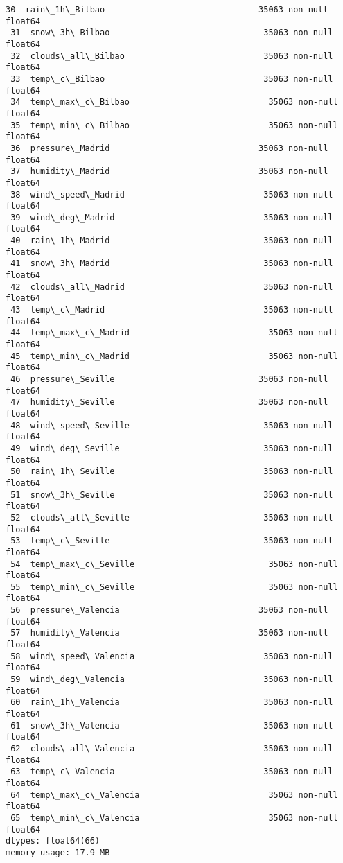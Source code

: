 \documentclass[11pt]{article}
\begin{document}
\begin{Verbatim}[commandchars=\\\{\}]
 30  rain\_1h\_Bilbao                               35063 non-null  float64
 31  snow\_3h\_Bilbao                               35063 non-null  float64
 32  clouds\_all\_Bilbao                            35063 non-null  float64
 33  temp\_c\_Bilbao                                35063 non-null  float64
 34  temp\_max\_c\_Bilbao                            35063 non-null  float64
 35  temp\_min\_c\_Bilbao                            35063 non-null  float64
 36  pressure\_Madrid                              35063 non-null  float64
 37  humidity\_Madrid                              35063 non-null  float64
 38  wind\_speed\_Madrid                            35063 non-null  float64
 39  wind\_deg\_Madrid                              35063 non-null  float64
 40  rain\_1h\_Madrid                               35063 non-null  float64
 41  snow\_3h\_Madrid                               35063 non-null  float64
 42  clouds\_all\_Madrid                            35063 non-null  float64
 43  temp\_c\_Madrid                                35063 non-null  float64
 44  temp\_max\_c\_Madrid                            35063 non-null  float64
 45  temp\_min\_c\_Madrid                            35063 non-null  float64
 46  pressure\_Seville                             35063 non-null  float64
 47  humidity\_Seville                             35063 non-null  float64
 48  wind\_speed\_Seville                           35063 non-null  float64
 49  wind\_deg\_Seville                             35063 non-null  float64
 50  rain\_1h\_Seville                              35063 non-null  float64
 51  snow\_3h\_Seville                              35063 non-null  float64
 52  clouds\_all\_Seville                           35063 non-null  float64
 53  temp\_c\_Seville                               35063 non-null  float64
 54  temp\_max\_c\_Seville                           35063 non-null  float64
 55  temp\_min\_c\_Seville                           35063 non-null  float64
 56  pressure\_Valencia                            35063 non-null  float64
 57  humidity\_Valencia                            35063 non-null  float64
 58  wind\_speed\_Valencia                          35063 non-null  float64
 59  wind\_deg\_Valencia                            35063 non-null  float64
 60  rain\_1h\_Valencia                             35063 non-null  float64
 61  snow\_3h\_Valencia                             35063 non-null  float64
 62  clouds\_all\_Valencia                          35063 non-null  float64
 63  temp\_c\_Valencia                              35063 non-null  float64
 64  temp\_max\_c\_Valencia                          35063 non-null  float64
 65  temp\_min\_c\_Valencia                          35063 non-null  float64
dtypes: float64(66)
memory usage: 17.9 MB
    \end{Verbatim}
\end{document}
